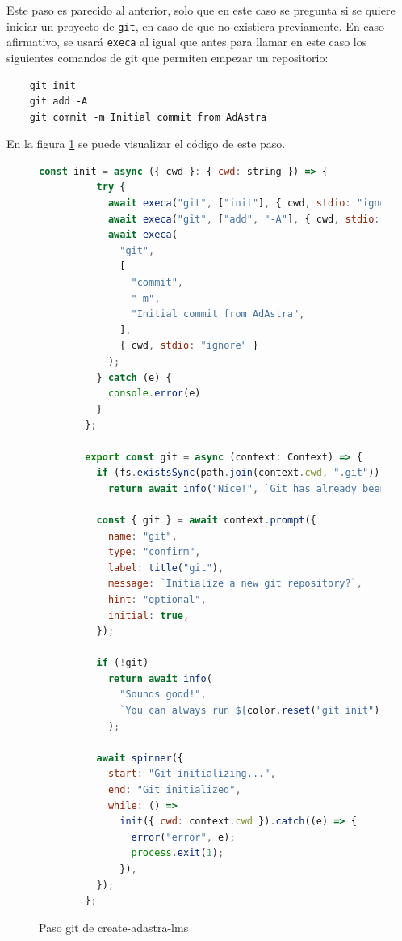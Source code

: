 Este paso es parecido al anterior, solo que en este caso se pregunta si se quiere iniciar un proyecto de \verb|git|\cite{git}, en caso de que no existiera previamente. En caso afirmativo, se usará \verb|execa| al igual que antes para llamar en este caso los siguientes comandos de git que permiten empezar un repositorio:
\begin{verbatim}
    git init
    git add -A
    git commit -m Initial commit from AdAstra 
\end{verbatim}

En la figura \ref{fig:adastraCreateGit} se puede visualizar el código de este paso.

\begin{figure}
    \begin{lstlisting}[language=Javascript]
        const init = async ({ cwd }: { cwd: string }) => {
          try {
            await execa("git", ["init"], { cwd, stdio: "ignore" });
            await execa("git", ["add", "-A"], { cwd, stdio: "ignore" });
            await execa(
              "git",
              [
                "commit",
                "-m",
                "Initial commit from AdAstra",
              ],
              { cwd, stdio: "ignore" }
            );
          } catch (e) {
            console.error(e)
          }
        };
        
        export const git = async (context: Context) => {
          if (fs.existsSync(path.join(context.cwd, ".git")))
            return await info("Nice!", `Git has already been initialized`);
        
          const { git } = await context.prompt({
            name: "git",
            type: "confirm",
            label: title("git"),
            message: `Initialize a new git repository?`,
            hint: "optional",
            initial: true,
          });
        
          if (!git)
            return await info(
              "Sounds good!",
              `You can always run ${color.reset("git init")}${color.dim(" manually.")}`
            );
        
          await spinner({
            start: "Git initializing...",
            end: "Git initialized",
            while: () =>
              init({ cwd: context.cwd }).catch((e) => {
                error("error", e);
                process.exit(1);
              }),
          });
        };
    \end{lstlisting}
    \caption{Paso git de create-adastra-lms}
    \label{fig:adastraCreateGit}
\end{figure}




